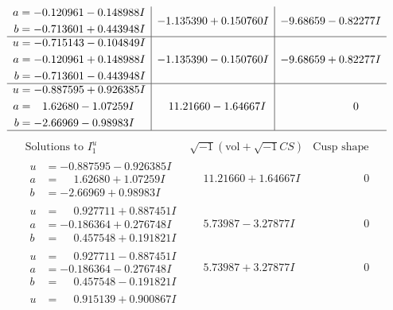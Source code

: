 \documentclass[1p]{elsarticle_modified}
\theoremstyle{definition}
\newcommand{\I}{\sqrt{-1}}
\begin{document}
$$\begin{array}{c|c|c}
\begin{aligned}
a &= -0.120961 - 0.148988 I \\
b &= -0.713601 + 0.443948 I\end{aligned}
 & -1.135390 + 0.150760 I & -9.68659 - 0.82277 I \\ \hline\begin{aligned}
u &= -0.715143 - 0.104849 I \\
a &= -0.120961 + 0.148988 I \\
b &= -0.713601 - 0.443948 I\end{aligned}
 & -1.135390 - 0.150760 I & -9.68659 + 0.82277 I \\ \hline\begin{aligned}
u &= -0.887595 + 0.926385 I \\
a &= \phantom{-}1.62680 - 1.07259 I \\
b &= -2.66969 - 0.98983 I\end{aligned}
 & \phantom{-}11.21660 - 1.64667 I & \phantom{-0.000000 } 0\\
 \hline 
 \end{array}$$\newpage$$\begin{array}{c|c|c}  
\text{Solutions to }I^u_{1}& \I (\text{vol} + \sqrt{-1}CS) & \text{Cusp shape}\\
 \hline 
\begin{aligned}
u &= -0.887595 - 0.926385 I \\
a &= \phantom{-}1.62680 + 1.07259 I \\
b &= -2.66969 + 0.98983 I\end{aligned}
 & \phantom{-}11.21660 + 1.64667 I & \phantom{-0.000000 } 0 \\ \hline\begin{aligned}
u &= \phantom{-}0.927711 + 0.887451 I \\
a &= -0.186364 + 0.276748 I \\
b &= \phantom{-}0.457548 + 0.191821 I\end{aligned}
 & \phantom{-}5.73987 - 3.27877 I & \phantom{-0.000000 } 0 \\ \hline\begin{aligned}
u &= \phantom{-}0.927711 - 0.887451 I \\
a &= -0.186364 - 0.276748 I \\
b &= \phantom{-}0.457548 - 0.191821 I\end{aligned}
 & \phantom{-}5.73987 + 3.27877 I & \phantom{-0.000000 } 0 \\ \hline\begin{aligned}
u &= \phantom{-}0.915139 + 0.900867 I \\

\end{aligned}
\end{array}$$
\end{document}

